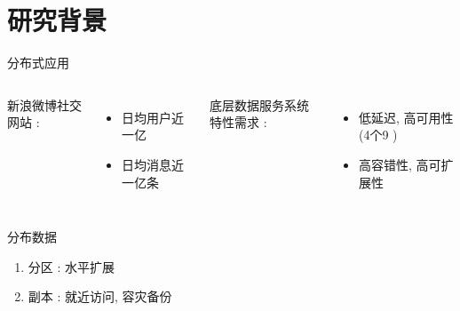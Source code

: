 \section{研究背景}

\begin{frame}{分布式应用}

  \begin{columns}
	新浪微博社交网站 \footnotemark:
	\begin{itemize}
	  \item 日均用户近一亿
	  \item 日均消息近一亿条
	\end{itemize}

	底层数据服务系统特性需求 : 
	\begin{itemize}
	  \item 低延迟, 高可用性 (4个9 \footnotemark)
	  \item 高容错性, 高可扩展性
	\end{itemize}
  \end{columns}
  
\end{frame}
\begin{frame}{分布数据}
  \graphicspath{{tikz-in-beamer/}}
  \begin{figure}[h!]
    \centering
    \begin{adjustbox}{max totalsize = {0.60\textwidth}{1.00\textheight}, center}
	  
    \end{adjustbox}
  \end{figure}

   
  \begin{enumerate}
	\item<2-> 分区 : 水平扩展
	\item<3-> 副本 : 就近访问, 容灾备份
  \end{enumerate}
\end{frame}
